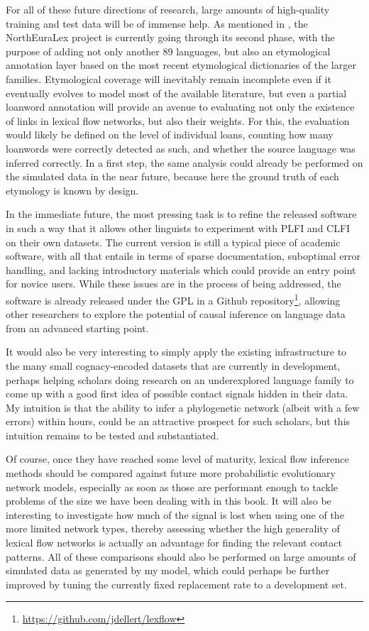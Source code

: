 For all of these future directions of research, large amounts of high-quality training and test data will be of immense help. As mentioned in , the NorthEuraLex project is currently going through its second phase, with the purpose of adding not only another 89 languages, but also an etymological annotation layer based on the most recent etymological dictionaries of the larger families. Etymological coverage will inevitably remain incomplete even if it eventually evolves to model most of the available literature, but even a partial loanword annotation will provide an avenue to evaluating not only the existence of links in lexical flow networks, but also their weights. For this, the evaluation would likely be defined on the level of individual loans, counting how many loanwords were correctly detected as such, and whether the source language was inferred correctly. In a first step, the same analysis could already be performed on the simulated data in the near future, because here the ground truth of 
each etymology is known by design.

In the immediate future, the most pressing task is to refine the released software in such a way that it allows other linguists to experiment with PLFI and CLFI on their own datasets. The current version is still a typical piece of academic software, with all that entails in terms of sparse documentation, suboptimal error handling, and lacking introductory materials which could provide an entry point for novice users. While these issues are in the process of being addressed, the software is already released under the GPL in a Github repository\footnote{\url{https://github.com/jdellert/lexflow}}, allowing other researchers to explore the potential of causal inference on language data from an advanced starting point.

\largerpage
It would also be very interesting to simply apply the existing infrastructure to the many small cognacy-encoded datasets that are currently in development, perhaps helping scholars doing research on an underexplored language family to come up with a good first idea of possible contact signals hidden in their data. My intuition is that the ability to infer a phylogenetic network (albeit with a few errors) within hours, could be an attractive prospect for such scholars, but this intuition remains to be tested and substantiated.

Of course, once they have reached some level of maturity, lexical flow inference methods should be compared against future more probabilistic evolutionary network models, especially as soon as those are performant enough to tackle problems of the size we have been dealing with in this book. It will also be interesting to investigate how much of the signal is lost when using one of the more limited network types, thereby assessing whether the high generality of lexical flow networks is actually an advantage for finding the relevant contact patterns. All of these comparisons should also be performed on large amounts of simulated data as generated by my model, which could perhaps be further improved by tuning the currently fixed replacement rate to a development set.

